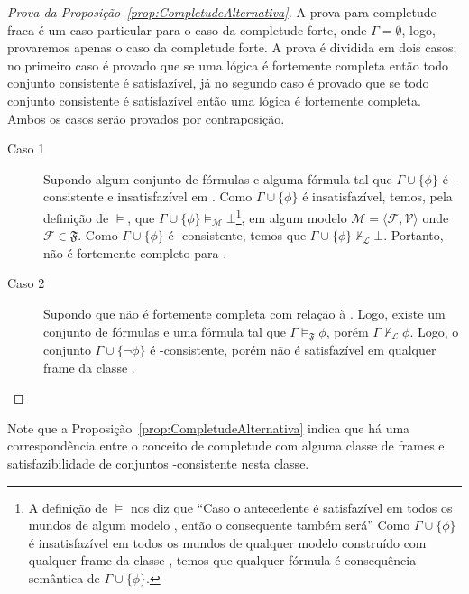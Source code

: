         \begin{proof}[Prova da Proposição~\ref{prop:CompletudeAlternativa}]
            A prova para completude fraca é um caso particular para o caso da completude forte, onde \(\Gamma = \emptyset\), logo, provaremos apenas o caso
            da completude forte. A prova é dividida em dois casos; no primeiro caso é provado que se uma lógica é fortemente completa
            então todo conjunto consistente é satisfazível, já no segundo caso é provado que se todo conjunto consistente é satisfazível então uma lógica
            é fortemente completa. Ambos os casos serão provados por contraposição.

            \begin{description}
                \item[Caso 1] Supondo algum conjunto de fórmulas \GAMMA e alguma fórmula \PHI tal que \(\Gamma \cup \{\phi\}\) é
                -consistente e insatisfazível em .
                Como \(\Gamma \cup \{\phi\}\) é insatisfazível, temos, pela definição de \(\vDash\), que \(\Gamma \cup \{\phi\} \vDash_{\mathcal{M}} \bot\)\footnote{A definição de \(\vDash\)
                nos diz que ``Caso o antecedente é satisfazível em todos os mundos de algum modelo , então o consequente também será'' Como \(\Gamma \cup \{\phi\}\) é insatisfazível em
                todos os mundos de qualquer modelo  construído com qualquer frame da classe , temos que qualquer fórmula é consequência semântica de \(\Gamma \cup \{\phi\}\).},
                em algum modelo \(\mathcal{M} = \langle \mathcal{F}, \mathcal{V} \rangle\) onde \(\mathcal{F} \in \mathfrak{F}\).
                Como \(\Gamma \cup \{\phi\}\) é -consistente, temos que \(\Gamma \cup \{\phi\} \nvdash_{\mathcal{L}} \bot\).
                Portanto,  não é fortemente completo para .

                \item[Caso 2] Supondo que  não é fortemente completa com relação à . Logo, existe um conjunto
                de fórmulas \GAMMA e uma fórmula \PHI tal que \(\Gamma \vDash_{\mathfrak{F}} \phi\), porém \(\Gamma \nvdash_{\mathcal{L}} \phi\).
                Logo, o conjunto \(\Gamma \cup \{\neg \phi\}\) é -consistente, porém não é satisfazível em qualquer frame da classe .\qedhere
            \end{description}
        \end{proof}

        Note que a Proposição~\ref{prop:CompletudeAlternativa} indica que há uma correspondência entre o conceito de completude com alguma classe de frames
        e satisfazibilidade de conjuntos -consistente nesta classe.